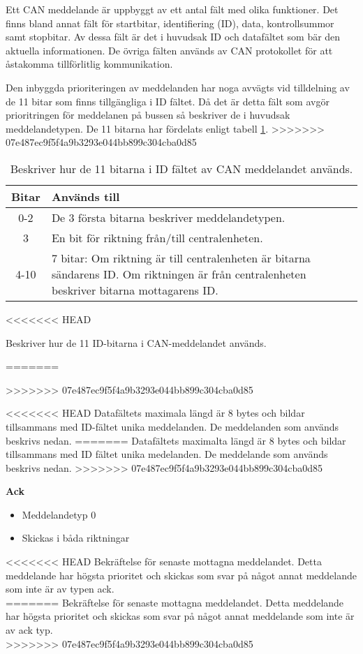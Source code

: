 Ett CAN meddelande är uppbyggt av ett antal fält med olika funktioner. Det finns bland annat fält för startbitar, identifiering (ID), data, kontrollsummor samt stopbitar.
Av dessa fält är det i huvudsak ID och datafältet som bär den aktuella informationen.
De övriga fälten används av CAN protokollet för att åstakomma tillförlitlig kommunikation.

Den inbyggda prioriteringen av meddelanden har noga avvägts vid tilldelning av de 11 bitar som finns tillgängliga i ID fältet.
Då det är detta fält som avgör prioritringen för meddelanen på bussen så beskriver de i huvudsak meddelandetypen.
De 11 bitarna har fördelats enligt tabell \ref{tab:idbitar}.
>>>>>>> 07e487ec9f5f4a9b3293e044bb899c304cba0d85

\begin{table}[H]
	\centering
	\begin{tabular}{|c|p{}|}
		\hline
		Bitar 	& Används till \\ \hline \hline
		0-2		& De 3 första bitarna beskriver meddelandetypen. \\ \hline
		3		& En bit för riktning från/till centralenheten. \\ \hline
		4-10	& 7 bitar:
		Om riktning är till centralenheten är bitarna sändarens ID.
		Om riktningen är från centralenheten beskriver bitarna mottagarens ID. \\ \hline

	\end{tabular}
<<<<<<< HEAD
	\caption{Beskriver hur de 11 ID-bitarna i CAN-meddelandet används.}
=======
	\caption{Beskriver hur de 11 bitarna i ID fältet av CAN meddelandet används.}
>>>>>>> 07e487ec9f5f4a9b3293e044bb899c304cba0d85
	\label{tab:idbitar}
\end{table}


<<<<<<< HEAD
Datafältets maximala längd är 8 bytes och bildar tillsammans med ID-fältet unika meddelanden. De meddelanden som används beskrivs nedan.
=======
Datafältets maximalta längd är 8 bytes och bildar tillsammans med ID fältet unika medelanden.
De meddelande som används beskrivs nedan.
>>>>>>> 07e487ec9f5f4a9b3293e044bb899c304cba0d85



\textbf{Ack}
\begin{itemize}
    \item Meddelandetyp 0
    \item Skickas i båda riktningar
\end{itemize}
<<<<<<< HEAD
Bekräftelse för senaste mottagna meddelandet. Detta meddelande har högsta prioritet och skickas som svar på något annat meddelande som inte är av typen ack. \\
=======
Bekräftelse för senaste mottagna meddelandet.
Detta meddelande har högsta prioritet och skickas som svar på något annat meddelande som inte är av ack typ. \\
>>>>>>> 07e487ec9f5f4a9b3293e044bb899c304cba0d85


